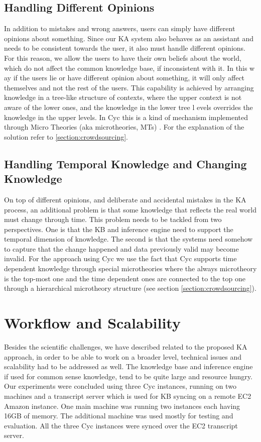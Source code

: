 \subsection{Handling Different Opinions}
In addition to mistakes and wrong answers, users can simply have different 
opinions about something. Since our KA system also behaves as an assistant and 
needs to be consistent towards the user, it also must handle different opinions. 
For this reason, we allow the users to have their own beliefs about the world, 
which do not affect the common knowledge base, if inconsistent with it. In this w
ay if the users lie or have different opinion about something, it will only 
affect themselves and not the rest of the users. This capability is achieved by 
arranging knowledge in a tree-like structure of contexts, where the upper 
context is not aware of the lower ones, and the knowledge in the lower tree l
evels overrides the knowledge in the upper levels. In Cyc this is a kind of 
mechanism implemented through Micro Theories (aka microtheories, MTs)
\parencite{Kleer2013}. For the explanation of the solution refer to 
\autoref{section:crowdsourcing}. 

\subsection{Handling Temporal Knowledge and Changing Knowledge}
On top of different opinions, and deliberate and accidental mistakes in the 
KA process, an additional problem is that some knowledge that reflects the real 
world must change through time. This problem needs to be tackled from two 
perspectives. One is that the KB and inference engine need to support the 
temporal dimension of knowledge. The second is that the systems need somehow to 
capture that the change happened and data previously valid may become invalid. 
For the approach using Cyc we use the fact that Cyc supports time dependent 
knowledge through special microtheories where the always microtheory is the 
top-most one and the time dependent ones are connected to the top one through 
a hierarchical microtheory structure (see section \ref{section:crowdsourcing}). 

\section{Workflow and Scalability}
Besides the scientific challenges, we have described related to the proposed 
KA approach, in order to be able to work on a broader level, technical issues 
and scalability had to be addressed as well. The knowledge base and inference 
engine if used for common sense knowledge, tend to be quite large and resource 
hungry. Our experiments were concluded using three Cyc instances, running on 
two machines and a transcript server which is used for KB syncing on a remote 
EC2 Amazon instance. One main machine was running two instances each having 
16GB of memory. The additional machine was used mostly for testing and 
evaluation. All the three Cyc instances were synced over the EC2 
transcript server.

